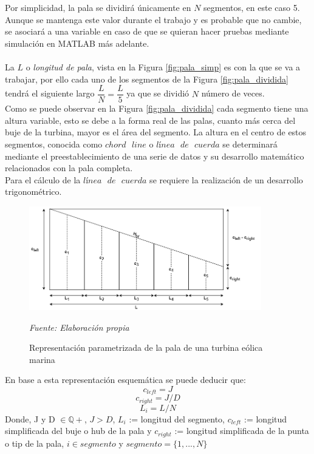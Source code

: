 Por simplicidad, la pala se dividirá únicamente en $N$ segmentos, en este caso 5. Aunque se mantenga este valor durante el trabajo y es probable que no cambie, se asociará a una variable en caso de que se quieran hacer pruebas mediante simulación en MATLAB más adelante. \\\\
    

La $L$ o \textit{longitud de pala}, vista en la Figura \ref{fig:pala_simp} es con la que se va a trabajar, por ello cada uno de los segmentos de la Figura \ref{fig:pala_dividida} tendrá el siguiente largo $\dfrac{L}{N} = \dfrac{L}{5}$ ya que se dividió $N$ número de veces. \\

Como se puede observar en la Figura \ref{fig:pala_dividida} cada segmento tiene una altura variable, esto se debe a la forma real de las palas, cuanto más cerca del buje de la turbina, mayor es el área del segmento. La altura en el centro de estos segmentos, conocida como $chord \text{ } line$ o $línea \text{ } de \text{ } cuerda$ se determinará mediante el preestablecimiento de una serie de datos y su desarrollo matemático relacionados con la pala completa.\\

Para el cálculo de la $línea \text{ } de \text{ } cuerda$ se requiere la realización de un desarrollo trigonométrico. 

\begin{figure}[H]
    \centering
    \includegraphics[width=0.9\textwidth]{images/planteo chord line.png}
    \caption{Representación parametrizada de la pala de una turbina eólica marina}
    \textit{Fuente: Elaboración propia}
    \label{fig:pala_desarrollo_chord}
\end{figure}



\begin{definicion}
En base a esta representación esquemática se puede deducir que:
$$ c_{left} = J$$
$$ c_{right} = J/D$$
$$ L_i = L/N$$
Donde,
\centering
J y D $\in \mathbb{Q+}$, \hspace{2pt} $J > D$, \hspace{2pt} $L_i$ := longitud del segmento,  $c_{left}$ := longitud simplificada del buje o hub de la pala y $c_{right}$ := longitud simplificada de la punta o tip de la pala, $i \in segmento$ y $segmento = \{1, ..., N\}$ 
\label{def_laterales_pala}
\end{definicion}


